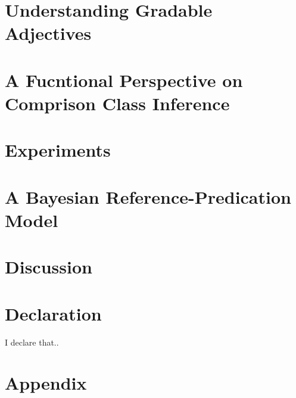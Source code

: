 \documentclass[12pt]{report}
\begin{document}
\chapter{Understanding Gradable Adjectives}
\label{chapter02}


\chapter{A Fucntional Perspective on Comprison Class Inference}
\label{chapter03}


\chapter{Experiments}
\label{chapter04}


\chapter{A Bayesian Reference-Predication Model}
\label{chapter05}


\chapter{Discussion}
\label{chapter06}


\chapter*{Declaration}
I declare that..

\appendix
\chapter{Appendix}	
\label{appendix}


\printbibliography
%
\end{document}
